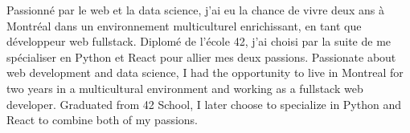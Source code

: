 
{
    Passionné par le web et la data science, j’ai eu la chance de vivre deux ans à Montréal dans un environnement
    multiculturel enrichissant, en tant que développeur web fullstack.
    Diplomé de l'école 42, j'ai choisi par la suite de me spécialiser en Python et React pour allier mes deux passions.
}
{
    Passionate about web development and data science, I had the opportunity to live in Montreal for two years in a
    multicultural environment and working as a fullstack web developer.
    Graduated from 42 School, I later choose to specialize in Python and React to combine both of my passions.
}
